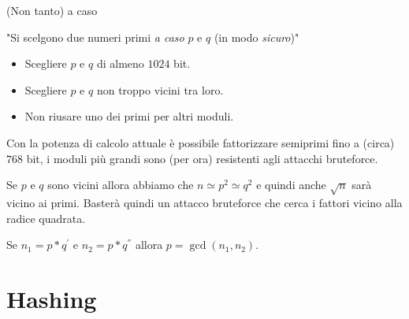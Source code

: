 \documentclass[handout, xcolor=dvipsnames,aspectratio=169]{beamer}
\begin{document}
\begin{frame}{(Non tanto) a caso}

\pause

"Si scelgono due numeri primi \textit{a caso} $p$ e $q$ (in modo \textit{sicuro})"

\begin{itemize}
  \item Scegliere $p$ e $q$ di almeno $1024$ bit.
  \item Scegliere $p$ e $q$ non troppo vicini tra loro.
  \item Non riusare uno dei primi per altri moduli.
\end{itemize}

\smallskip
\pause
Con la potenza di calcolo attuale è possibile fattorizzare semiprimi fino a (circa) $768$ bit, i moduli più grandi sono (per ora) resistenti agli attacchi bruteforce.

\smallskip
\pause
Se $p$ e $q$ sono vicini allora abbiamo che $n \simeq p^2 \simeq q^2$ e quindi anche $\sqrt{n}$ sarà vicino ai primi. Basterà quindi un attacco bruteforce che cerca i fattori vicino alla radice quadrata.

\smallskip
\pause

Se $n_1 = p*q^{'}$ e $n_2 = p*q^{''}$ allora $p = \gcd(n_1, n_2)$.

\end{frame}


\part{Hashing}

\begin{frame}
	\partpage
	\centering
\end{frame}
\end{document}
